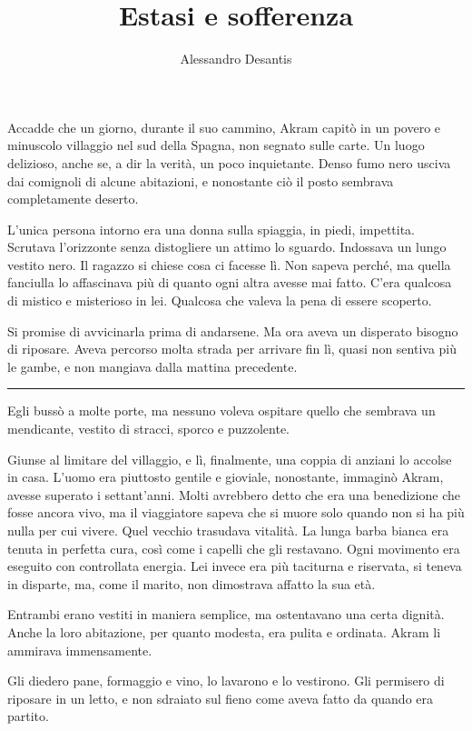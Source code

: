 \documentclass[a4paper,10pt]{memoir}
\title{Estasi e sofferenza}
\author{Alessandro Desantis}
\date{}
\begin{document}
\begin{titlingpage}
\maketitle
\end{titlingpage}

Accadde che un giorno, durante il suo cammino, Akram capitò in un povero e minuscolo villaggio nel sud della Spagna, non
segnato sulle carte. Un luogo delizioso, anche se, a dir la verità, un poco inquietante. Denso fumo nero usciva dai
comignoli di alcune abitazioni, e nonostante ciò il posto sembrava completamente deserto.

L'unica persona intorno era una donna sulla spiaggia, in piedi, impettita. Scrutava l'orizzonte senza distogliere un
attimo lo sguardo. Indossava un lungo vestito nero. Il ragazzo si chiese cosa ci facesse lì. Non sapeva perché, ma
quella fanciulla lo affascinava più di quanto ogni altra avesse mai fatto. C'era qualcosa di mistico e misterioso in
lei. Qualcosa che valeva la pena di essere scoperto.

Si promise di avvicinarla prima di andarsene. Ma ora aveva un disperato bisogno di riposare. Aveva percorso molta strada
per arrivare fin lì, quasi non sentiva più le gambe, e non mangiava dalla mattina precedente.

\plainbreak{1}

Egli bussò a molte porte, ma nessuno voleva ospitare quello che sembrava un mendicante, vestito di stracci, sporco e
puzzolente.

Giunse al limitare del villaggio, e lì, finalmente, una coppia di anziani lo accolse in casa. L'uomo era piuttosto
gentile e gioviale, nonostante, immaginò Akram, avesse superato i settant'anni. Molti avrebbero detto che era una
benedizione che fosse ancora vivo, ma il viaggiatore sapeva che si muore solo quando non si ha più nulla per cui vivere.
Quel vecchio trasudava vitalità. La lunga barba bianca era tenuta in perfetta cura, così come i capelli che gli
restavano. Ogni movimento era eseguito con controllata energia. Lei invece era più taciturna e riservata, si teneva in
disparte, ma, come il marito, non dimostrava affatto la sua età.

Entrambi erano vestiti in maniera semplice, ma ostentavano una certa dignità. Anche la loro abitazione, per quanto
modesta, era pulita e ordinata. Akram li ammirava immensamente.

Gli diedero pane, formaggio e vino, lo lavarono e lo vestirono. Gli permisero di riposare in un letto, e non sdraiato
sul fieno come aveva fatto da quando era partito.
\end{document}
